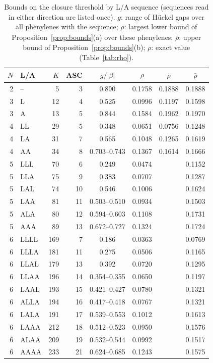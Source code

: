\documentclass[11pt]{article}
\begin{document}
\begin{table}[t]
\centering
\caption{Bounds on the closure threshold by L/A sequence (sequences read in either direction are listed once). $g$: range of H\"uckel gaps over all phenylenes with the sequence; $\underline\rho$: largest lower bound of Proposition~\ref{prop:bounds}(a) over these phenylenes; $\bar\rho$: upper bound of Proposition~\ref{prop:bounds}(b); $\rho$: exact value (Table~\ref{tab:rho}).}
\label{tab:bounds}
\small
\begin{tabular}{rlrrcccc}
\toprule
$N$ & L/A & $K$ & ASC & $g/|\beta|$ & $\underline\rho$ & $\rho$ & $\bar\rho$ \\
\midrule
2 & --   & 5   & 3  & 0.890       & 0.1758 & 0.1888 & 0.1888 \\
3 & L    & 12  & 4  & 0.525       & 0.0996 & 0.1197 & 0.1598 \\
3 & A    & 13  & 5  & 0.844       & 0.1584 & 0.1962 & 0.1970 \\
4 & LL   & 29  & 5  & 0.348       & 0.0651 & 0.0756 & 0.1248 \\
4 & LA   & 31  & 7  & 0.565       & 0.1048 & 0.1265 & 0.1619 \\
4 & AA   & 34  & 8  & 0.703--0.743 & 0.1367 & 0.1614 & 0.1666 \\
5 & LLL  & 70  & 6  & 0.249       & 0.0474 & & 0.1152 \\
5 & LLA  & 75  & 9  & 0.383       & 0.0707 & & 0.1287 \\
5 & LAL  & 74  & 10 & 0.546       & 0.1006 & & 0.1624 \\
5 & LAA  & 81  & 11 & 0.503--0.510 & 0.0934 & & 0.1503 \\
5 & ALA  & 80  & 12 & 0.594--0.603 & 0.1108 & & 0.1731 \\
5 & AAA  & 89  & 13 & 0.672--0.727 & 0.1324 & & 0.1724 \\
6 & LLLL & 169 & 7  & 0.186       & 0.0363 & & 0.0769 \\
6 & LLLA & 181 & 11 & 0.275       & 0.0506 & & 0.1165 \\
6 & LLAL & 179 & 13 & 0.392       & 0.0720 & & 0.1295 \\
6 & LLAA & 196 & 14 & 0.354--0.355 & 0.0650 & & 0.1197 \\
6 & LAAL & 193 & 15 & 0.421--0.427 & 0.0780 & & 0.1321 \\
6 & ALLA & 194 & 16 & 0.417--0.418 & 0.0767 & & 0.1321 \\
6 & LALA & 191 & 17 & 0.539--0.553 & 0.1012 & & 0.1613 \\
6 & LAAA & 212 & 18 & 0.512--0.523 & 0.0950 & & 0.1576 \\
6 & ALAA & 209 & 19 & 0.532--0.544 & 0.0992 & & 0.1517 \\
6 & AAAA & 233 & 21 & 0.624--0.685 & 0.1243 & & 0.1575 \\
\bottomrule
\end{tabular}
\end{table}
\end{document}
